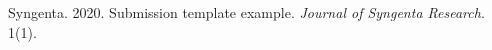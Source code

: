 \documentclass[syngen,nonblindrev]{informs3-syngen}
\begin{document}



\begin{thebibliography}{}
Syngenta. 2020. Submission template example. \textit{Journal of Syngenta Research}. 1(1).
\end{thebibliography}

\end{document}
